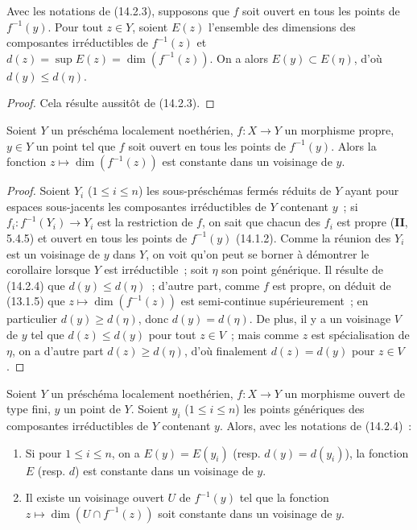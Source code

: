 \begin{corollary}[14.2.4]
\label{IV.14.2.4-fr}
Avec les notations de (14.2.3), supposons que $f$ soit ouvert en tous les points
de $f^{-1}(y)$. Pour tout $z\in Y$, soient $E(z)$ l'ensemble des dimensions des
composantes irréductibles de $f^{-1}(z)$ et
$d(z)=\sup E(z)=\dim(f^{-1}(z))$. On a alors $E(y)\subset E(\eta)$, d'où
$d(y)\leq d(\eta)$.
\end{corollary}

\begin{proof}
Cela résulte aussitôt de (14.2.3).
\end{proof}

\begin{corollary}[14.2.5]
\label{IV.14.2.5-fr}
Soient $Y$ un préschéma localement noethérien, $f:X\to Y$ un morphisme propre,
$y\in Y$ un point tel que $f$ soit ouvert en tous les points de $f^{-1}(y)$. Alors
la fonction $z\mapsto\dim(f^{-1}(z))$ est constante dans un voisinage de $y$.
\end{corollary}

\begin{proof}
Soient $Y_i$ ($1\leq i\leq n$) les sous-préschémas fermés réduits de $Y$ ayant
pour espaces sous-jacents les composantes irréductibles de $Y$ contenant $y$~;
si $f_i:f^{-1}(Y_i)\to Y_i$ est la restriction de $f$, on sait que chacun des
$f_i$ est propre (\textbf{II}, 5.4.5) et ouvert en tous les points de $f^{-1}(y)$
(14.1.2). Comme la réunion des $Y_i$ est un voisinage de $y$ dans $Y$,
on voit qu'on peut se borner à démontrer le corollaire lorsque $Y$ est
irréductible~; soit $\eta$ son point générique. Il résulte de (14.2.4) que
$d(y)\leq d(\eta)$~; d'autre part, comme $f$ est propre, on déduit de (13.1.5) que
$z\mapsto\dim(f^{-1}(z))$ est semi-continue supérieurement~; en particulier
$d(y)\geq d(\eta)$, donc $d(y)=d(\eta)$. De plus, il y a un voisinage $V$ de $y$
tel que $d(z)\leq d(y)$ pour tout $z\in V$~; mais comme $z$ est spécialisation de
$\eta$, on a d'autre part $d(z)\geq d(\eta)$, d'où finalement $d(z)=d(y)$ pour
$z\in V$.
\end{proof}

\begin{corollary}[14.2.6]
\label{IV.14.2.6-fr}
Soient $Y$ un préschéma localement noethérien, $f:X\to Y$ un morphisme ouvert de
type fini, $y$ un point de $Y$. Soient $y_i$ ($1\leq i\leq n$) les points
génériques des composantes irréductibles de $Y$ contenant $y$. Alors, avec les
notations de (14.2.4)~:
\begin{enumerate}[label=(\roman*)]
  \item Si pour $1\leq i\leq n$, on a $E(y)=E(y_i)$ (resp. $d(y)=d(y_i)$), la
  fonction $E$ (resp. $d$) est constante dans un voisinage de $y$.
  \item Il existe un voisinage ouvert $U$ de $f^{-1}(y)$ tel que la fonction
  $z\mapsto\dim(U\cap f^{-1}(z))$ soit constante dans un voisinage de $y$.
\end{enumerate}
\end{corollary}

